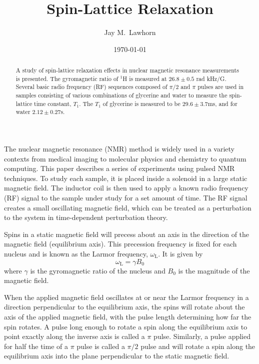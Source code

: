 \newcommand{\cd}{$\cdot$}

%
%


\title{Spin-Lattice Relaxation}
\author{Jay M.\ Lawhorn}
\date{\today}

\begin{abstract}
A study of spin-lattice relaxation effects in nuclear magnetic resonance measurements is presented. The gyromagnetic ratio of $^1$H is measured at $26.8\pm0.5$ rad kHz/G. Several basic radio frequency (RF) sequences composed of $\pi/2$ and $\pi$ pulses are used in samples consisting of various combinations of glycerine and water to measure the spin-lattice time constant, $T_1$. The $T_1$ of glycerine is measured to be $29.6\pm3.7$ms, and for water $2.12\pm0.27$s. 
\end{abstract}

\maketitle

The nuclear magnetic resonance (NMR) method is widely used in a variety contexts from medical imaging to molecular physics and chemistry to quantum computing. This paper describes a series of experiments using pulsed NMR techniques. To study each sample, it is placed inside a solenoid in a large static magnetic field. The inductor coil is then used to apply a known radio frequency (RF) signal to the sample under study for a set amount of time. The RF signal creates a small oscillating magnetic field, which can be treated as a perturbation to the system in time-dependent perturbation theory. 

Spins in a static magnetic field will precess about an axis in the direction of the magnetic field (equilibrium axis). This precession frequency is fixed for each nucleus and is known as the Larmor frequency, $\omega_{\mathrm{L}}$. It is given by  
\begin{equation}
\omega_{\mathrm{L}} = \gamma B_{0}
\label{eq:gamma}
\end{equation}
where $\gamma$ is the gyromagnetic ratio of the nucleus and $B_{0}$ is the magnitude of the magnetic field.

When the applied magnetic field oscillates at or near the Larmor frequency in a direction perpendicular to the equilibrium axis, the spins will rotate about the axis of the applied magnetic field, with the pulse length determining how far the spin rotates. A pulse long enough to rotate a spin along the equilibrium axis to point exactly along the inverse axis is called a $\pi$ pulse. Similarly, a pulse applied for half the time of a $\pi$ pulse is called a $\pi/2$ pulse and will rotate a spin along the equilibrium axis into the plane perpendicular to the static magnetic field. 

